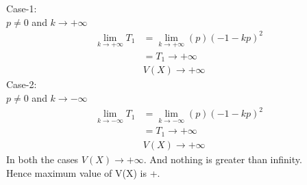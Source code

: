 \documentclass[journal,12pt,twocolumn]{IEEEtran}
\begin{document}
Case-1:\\
$p{\neq}0$ and $k{\rightarrow}+\infty$
\begin{align}
    \lim_{k{\rightarrow}+\infty}T_1&= \lim_{k{\rightarrow}+\infty}(p)(-1-kp)^2\\
    &=T_1{\rightarrow}{+\infty}\\
    &V(X){\rightarrow}{+\infty}
\end{align}
Case-2:\\
$p{\neq}0$ and $k{\rightarrow}-\infty$
\begin{align}
    \lim_{k{\rightarrow}-\infty}T_1&= \lim_{k{\rightarrow}-\infty}(p)(-1-kp)^2\\
    &=T_1{\rightarrow}{+\infty}\\
    &V(X){\rightarrow}{+\infty}
\end{align}
In both the cases $V(X){\rightarrow}{+\infty}$. And nothing is greater than infinity.\\
Hence maximum value of V(X) is +\infty.\\
\\
\end{document}
